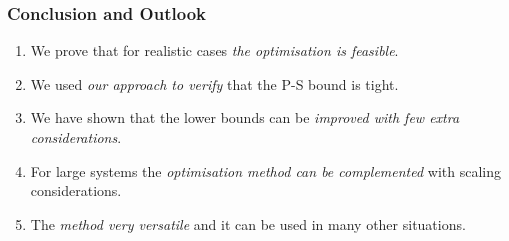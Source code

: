 \documentclass{beamer}
\begin{document}
	\begin{frame}
		\frametitle{Conclusion and Outlook}
		\begin{enumerate}
			\item<1-> We prove that for realistic cases \emph{\color{blue}the optimisation is feasible}.
			\vspace{5px}
			\item<2-> We used \emph{\color{blue}our approach to verify} that the P-S bound is tight.
			\vspace{5px}
			\item<3-> We have shown that the lower bounds can be \emph{\color{blue}improved with few extra considerations}.
			\vspace{5px}
			\item<4-> For large systems the \emph{\color{blue}optimisation method can be complemented} with scaling considerations.
			\vspace{5px}
			\item<5-> The \emph{\color{blue}method very versatile} and it can be used in many other situations.
		\end{enumerate}

	\end{frame}


\end{document}
